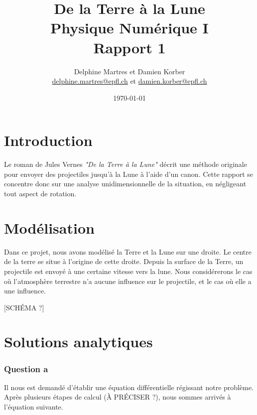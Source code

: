 \documentclass[a4paper,12pt,twoside]{article}
\newcommand{\mail}[1]{{\href{mailto:#1}{#1}}}
\begin{document}
\title{De la Terre à la Lune\\{\small Physique Numérique I}\\{\small Rapport 1}}
\date{\today}
\author{Delphine Martres et Damien Korber\\{\small \mail{delphine.martres@epfl.ch} et \mail{damien.korber@epfl.ch}}}
\maketitle
\tableofcontents %

\baselineskip=16pt
\parindent=15pt
\parskip=5pt




\section{Introduction}
Le roman de Jules Vernes \textit{"De la Terre à la Lune"} décrit une méthode originale pour envoyer des projectiles jusqu'à la Lune à l'aide d'un canon.
Cette rapport se concentre donc sur une analyse unidimensionnelle de la situation, en négligeant tout aspect de rotation.

\section{Modélisation}
Dans ce projet, nous avons modélisé la Terre et la Lune sur une droite.
Le centre de la terre se situe à l'origine de cette droite.
Depuis la surface de la Terre, un projectile est envoyé à une certaine vitesse vers la lune.
Nous considérerons le cas où l'atmosphère terrestre n'a aucune influence sur le projectile, et le cas où elle a une influence.

[SCHÉMA ?]

\section{Solutions analytiques}
\subsubsection*{Question a}
Il nous est demandé d'établir une équation différentielle régissant notre problème.
Après plusieurs étapes de calcul (À PRÉCISER ?), nous sommes arrivés à l'équation suivante.
\end{document}
